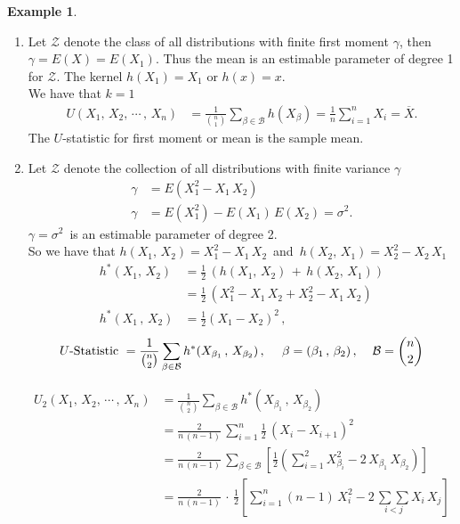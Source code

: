 \documentclass[12pt,a4paper]{report}
\theoremstyle{definition}
\newtheorem{exa}[thm]{Example}
\theoremstyle{plain}
\begin{document}
\begin{exa}
\begin{enumerate}
\item[(a)] Let $\mathscr{Z}$ denote the class of all distributions with finite first moment $\gamma$, then $\gamma = E(X) = E(X_1)$. Thus the mean is an estimable parameter of degree 1 for $\mathscr{Z}$. The kernel $h(X_1) = X_1$ or $h(x) = x$. \\

We have that $k = 1$
\begin{align*}
U(X_1,\, X_2,\, \cdots\, , \, X_n)  & = \frac{1}{\binom{n}{1}}\sum_{\beta\in \mathscr{B}} h\left(X_{\beta}\right) = \frac{1}{n}\sum^n_{i = 1} X_i = \overline{X}.
\end{align*}
The $U$-statistic for first moment or mean is the sample mean.
\item[(b)] Let $\mathscr{Z}$ denote the collection of all distributions with finite variance $\gamma$ 
\begin{align*}
\gamma & = E\left(X_1^2 - X_1\, X_2\right)\\
\gamma & = E\left(X_1^2\right) - E\left(X_1\right)\, E\left(X_2\right) = \sigma^2.
\end{align*}
$\gamma = \sigma^2\,$ is an estimable parameter of degree 2.\\
So we have that $h(X_1, \, X_2) = X_1^2 - X_1\, X_2\,$ and $\, h(X_2, \, X_1) = X_2^2 - X_2\, X_1$
\begin{align*}
h^*\left(X_1, \, X_2\right) & = \frac{1}{2}\, \left(h(X_1, \, X_2)\, + \, h(X_2,\, X_1)\right)\\
&  = \frac{1}{2}\, \left(X_1^2 - X_1\, X_2 + X_2^2 - X_1\, X_2\right)\\
h^*(X_1\,, \, X_2) & = \frac{1}{2} (X_1 - X_2)^2\, , 
\end{align*}
$$U\text{-Statistic}\,\, = \frac{1}{\binom{n}{2}}\sum_{\beta\in\mathcal{B}}h^*(X_{\beta_1}\, ,\, X_{\beta_2})\, ,\, \hspace{0.4cm} \beta = (\beta_1\, , \, \beta_2)\, , \hspace{0.4cm} \mathcal{B} = \binom{n}{2}$$

\begin{align*}
U_2(X_1,\, X_2,\, \cdots\, , \, X_n)
 & = \frac{1}{\binom{n}{2}}\sum_{\beta\in\mathcal{B}}h^*\left(X_{\beta_1}\, , \, X_{\beta_2}\right)\\
& = \frac{2}{n\, (n - 1)}\, \sum^n_{i = 1} \frac{1}{2}\, \left(X_i - X_{i + 1}\right)^2\\
& = \frac{2}{n\, (n-1)}\, \sum_{\beta\in \mathcal{B}}\left[\frac{1}{2}\left(\sum^2_{i=1}X^2_{\beta_i} - 2\,X_{\beta_1}\, X_{\beta_2}\right)\right]\\
& = \frac{2}{n\, (n-1)}\, \cdot\, \frac{1}{2}\left[\sum^n_{i = 1} (n - 1)\, X_i^2 - 2\, \underset{i<j}{\sum\sum}X_i\, X_j\right]
\end{align*}


\end{enumerate}
\end{exa}
\end{document}
